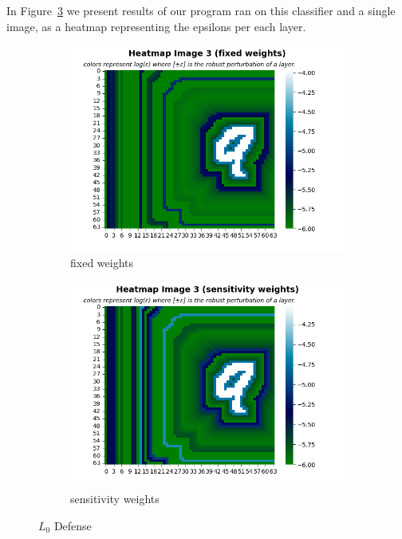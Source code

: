      In Figure~\ref{fig:L0 defense} we present results of our program ran on this classifier and a single image, as a heatmap representing the epsilons per each layer.
    \begin{figure}
         \centering
         \begin{subfigure}[b]{0.4\textwidth}
             \centering
             \includegraphics[width=\textwidth]{l0_defense_fixed_weights.png}
             \caption{fixed weights}
             \label{sub-fig:L0 defense FW}
         \end{subfigure}
         \hfill
         \begin{subfigure}[b]{0.4\textwidth}
             \centering
             \includegraphics[width=\textwidth]{l0_defense_sensitivity_weights.png}
             \caption{sensitivity weights}
             \label{sub-fig:L0 defense SW}
         \end{subfigure}
         \caption{$L_0$ Defense}
         \label{fig:L0 defense}
    \end{figure}